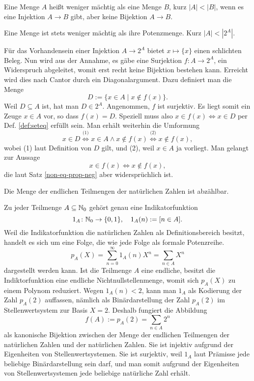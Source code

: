 \begin{Definition}\newlinefirst
Eine Menge $A$ heißt weniger mächtig als eine Menge $B$, kurz
$|A|<|B|$, wenn es eine Injektion $A\to B$ gibt, aber keine
Bijektion $A\to B$.
\end{Definition}

\begin{Satz}\newlinefirst
Eine Menge ist stets weniger mächtig als ihre Potenzmenge. Kurz $|A|<|2^A|$. 
\end{Satz}

\begin{Beweis}
Für das Vorhandensein einer Injektion $A\to 2^A$ bietet $x\mapsto\{x\}$
einen schlichten Beleg. Nun wird aus der Annahme, es gäbe eine Surjektion
$f\colon A\to 2^A$, ein Widerspruch abgeleitet, womit erst recht
keine Bijektion bestehen kann. Erreicht wird dies nach Cantor durch ein
Diagonalargument. Dazu definiert man die Menge
\[D := \{x\in A\mid x\notin f(x)\}.\]
Weil $D\subseteq A$ ist, hat man $D\in 2^A$. Angenommen, $f$ ist surjektiv.
Es liegt somit ein Zeuge $x\in A$ vor, so dass $f(x) = D$. Speziell muss also
$x\in f(x) \Leftrightarrow x\in D$
per Def. \ref{def:seteq} erfüllt sein. Man erhält weiterhin die Umformung
\[x\in D \stackrel{\text{(1)}}\iff x\in A\land x\notin f(x)
\stackrel{\text{(2)}}\iff x\notin f(x),\]
wobei (1) laut Definition von $D$ gilt, und (2), weil $x\in A$
ja vorliegt. Man gelangt zur Aussage
\[x\in f(x) \iff x\notin f(x),\]
die laut Satz \ref{non-eq-prop-neg} aber widersprüchlich ist.\,\qedsymbol
\end{Beweis}

\begin{Satz}
Die Menge der endlichen Teilmengen der natürlichen Zahlen ist
abzählbar.
\end{Satz}

\begin{Beweis}
Zu jeder Teilmenge $A\subseteq\mathbb N_0$ gehört genau eine Indikatorfunktion
\[1_A\colon\mathbb N_0\to\{0,1\},\quad 1_A(n) := [n\in A].\]
Weil die Indikatorfunktion die natürlichen Zahlen als Definitionsbereich
besitzt, handelt es sich um eine Folge, die wie jede Folge als formale Potenzreihe.
\[p_A(X) = \sum_{n=0}^\infty 1_A(n)X^n = \sum_{n\in A} X^n\]
dargestellt werden kann. Ist die Teilmenge $A$ eine endliche, besitzt
die Indiktorfunktion eine endliche Nichtnullstellenmenge, womit sich
$p_A(X)$ zu einem Polynom reduziert. Wegen $1_A(n)<2$, kann man
$1_A$ als Kodierung der Zahl $p_A(2)$ auffassen, nämlich als Binärdarstellung
der Zahl $p_A(2)$ im Stellenwertsystem zur Basis $X=2$. Deshalb fungiert
die Abbildung
\[f(A) := p_A(2) = \sum_{n\in A} 2^n\]
als kanonische Bijektion zwischen der Menge der endlichen Teilmengen der
natürlichen Zahlen und der natürlichen Zahlen. Sie ist injektiv
aufgrund der Eigenheiten von Stellenwertsystemen. Sie ist surjektiv,
weil $1_A$ laut Prämisse jede beliebige Binärdarstellung sein darf,
und man somit aufgrund der Eigenheiten von Stellenwertsystemen jede
beliebige natürliche Zahl erhält.\,\qedsymbol
\end{Beweis}
